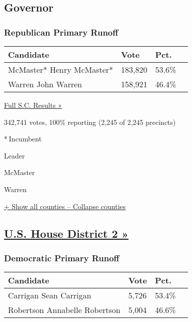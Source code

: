 \hypertarget{governor}{%
\subsection{Governor}\label{governor}}

\hypertarget{republican-primary-runoff}{%
\subsubsection{Republican Primary
Runoff}\label{republican-primary-runoff}}

\begin{longtable}[]{@{}llll@{}}
\toprule
Candidate & Vote & Pct. &\tabularnewline
\midrule
\endhead
 McMaster* Henry McMaster* & 183,820 & 53.6\% &\tabularnewline
 Warren John Warren & 158,921 & 46.4\% &\tabularnewline
\bottomrule
\end{longtable}

\href{https://www.nytimes3xbfgragh.onion/elections/results/south-carolina}{Full
S.C. Results »}

342,741 votes, 100\% reporting (2,245 of 2,245 precincts)

* Incumbent

Leader

 McMaster

 Warren

\protect\hyperlink{}{+ Show all counties -- Collapse counties}

\hypertarget{us-house-district-2-}{%
\subsection{\texorpdfstring{\href{https://www.nytimes3xbfgragh.onion/elections/results/south-carolina-house-district-2-primary-runoff-election}{U.S.
House District 2
»}}{U.S. House District 2 »}}\label{us-house-district-2-}}

\hypertarget{democratic-primary-runoff}{%
\subsubsection{Democratic Primary
Runoff}\label{democratic-primary-runoff}}

\begin{longtable}[]{@{}llll@{}}
\toprule
Candidate & Vote & Pct. &\tabularnewline
\midrule
\endhead
 Carrigan Sean Carrigan & 5,726 & 53.4\% &\tabularnewline
 Robertson Annabelle Robertson & 5,004 & 46.6\% &\tabularnewline
\bottomrule
\end{longtable}

